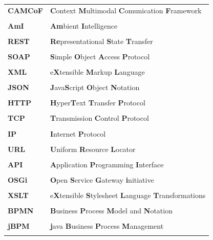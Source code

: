 \documentclass[a4paper, 12pt, oneside]{Thesis}  %
\begin{document}
\begin{table}[!h]
\begin{tabular}{ll} 
	\textbf{CAMCoF}	& \textbf{C}ontext \textbf{M}ultimodal  \textbf{C}omunication \textbf{F}ramework	 \\ \\
	\textbf{AmI}	& \textbf{Am}bient \textbf{I}ntelligence	 \\ \\
	\textbf{REST}	& \textbf{Re}presentational \textbf{S}tate \textbf{T}ransfer	 \\ \\
	\textbf{SOAP}	& \textbf{S}imple \textbf{O}bject  \textbf{A}ccess \textbf{P}rotocol	 \\ \\
	\textbf{XML}	& e\textbf{X}tensible \textbf{M}arkup  \textbf{L}anguage	 \\ \\
	\textbf{JSON}	& \textbf{J}ava\textbf{S}cript  \textbf{O}bject \textbf{N}otation	 \\ \\
	\textbf{HTTP}	& \textbf{H}yper\textbf{T}ext  \textbf{T}ransfer \textbf{P}rotocol	 \\ \\
	\textbf{TCP}	& \textbf{T}ransmission \textbf{C}ontrol  \textbf{P}rotocol	 \\ \\
	\textbf{IP}	& \textbf{I}nternet \textbf{P}rotocol	 \\ \\
	\textbf{URL}	& \textbf{U}niform \textbf{R}esource  \textbf{L}ocator	 \\ \\
	\textbf{API}	& \textbf{A}pplication \textbf{P}rogramming  \textbf{I}nterface  \\ \\
	\textbf{OSGi}	& \textbf{O}pen \textbf{S}ervice  \textbf{G}ateway \textbf{i}nitiative	 \\ \\
	\textbf{XSLT}	& e\textbf{X}tensible \textbf{S}tylesheet  \textbf{L}anguage \textbf{T}ransformations	 \\ \\
	\textbf{BPMN}	& \textbf{B}usiness \textbf{P}rocess  \textbf{M}odel and \textbf{N}otation	 \\ \\
	\textbf{jBPM}	& \textbf{j}ava  \textbf{B}usiness \textbf{P}rocess \textbf{M}anagement	
 \\ \\

\end{tabular}
\end{table}
\end{document}
